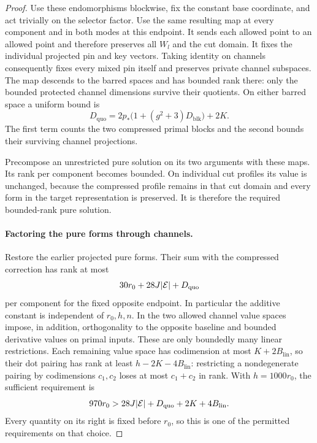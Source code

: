 \begin{proof}
Use these endomorphisms blockwise, fix the constant base
coordinate, and act trivially on the selector factor.  Use
the same resulting map at every component and in both modes
at this endpoint.  It sends each allowed point to an allowed
point and therefore preserves all $W_l$ and the cut domain.
It fixes the individual projected pin and key vectors.
Taking identity on channels consequently fixes every mixed
pin itself and preserves private channel subspaces.  The
map descends to the barred spaces and has bounded rank there:
only the bounded protected channel dimensions survive their
quotients.  On either barred space a uniform bound is
\begin{equation}\label{eq:quotient-compression-bound}
 D_{\mathrm{quo}}
 =2p_*\bigl(1+(g^2+3)D_{\mathrm{blk}}\bigr)+2K.
\end{equation}
The first term counts the two compressed primal blocks and
the second bounds their surviving channel projections.

Precompose an unrestricted pure solution on its two arguments
with these maps.  Its rank per component becomes bounded.
On individual cut profiles its value is unchanged, because
the compressed profile remains in that cut domain and every
form in the target representation is preserved.  It is
therefore the required bounded-rank pure solution.

\paragraph{Factoring the pure forms through channels.}
Restore the earlier projected pure forms.  Their sum with
the compressed correction has rank at most
\begin{equation}\label{eq:final-pure-rank}
 30r_0+28J|\mathcal E|+D_{\mathrm{quo}}
\end{equation}
per component for the fixed opposite endpoint.  In particular
the additive constant is independent of $r_0,h,n$.
In the two allowed channel value spaces impose, in addition,
orthogonality to the opposite baseline and bounded derivative
values on primal inputs.  These are only boundedly many
linear restrictions.  Each remaining value space has
codimension at most $K+2B_{\mathrm{lin}}$, so their dot pairing
has rank at least $h-2K-4B_{\mathrm{lin}}$: restricting a
nondegenerate pairing by codimensions $c_1,c_2$ loses at most
$c_1+c_2$ in rank.  With $h=1000r_0$, the sufficient requirement
is
\begin{equation}\label{eq:realization-r0-requirement}
 970r_0>28J|\mathcal E|+D_{\mathrm{quo}}+2K+4B_{\mathrm{lin}}.
\end{equation}
Every quantity on its right is fixed before $r_0$, so this is
one of the permitted requirements on that choice.


\end{proof}

